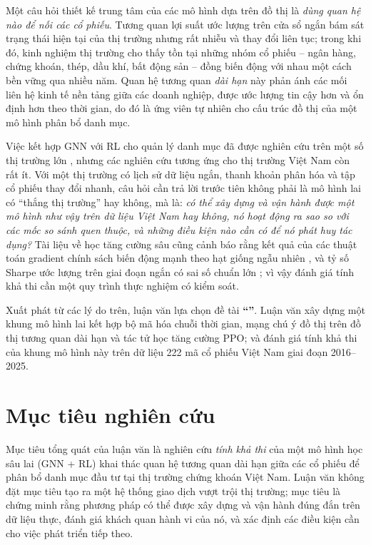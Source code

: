Một câu hỏi thiết kế trung tâm của các mô hình dựa trên đồ thị là \emph{dùng quan hệ nào để nối các cổ phiếu}. Tương quan lợi suất ước lượng trên cửa sổ ngắn bám sát trạng thái hiện tại của thị trường nhưng rất nhiễu và thay đổi liên tục; trong khi đó, kinh nghiệm thị trường cho thấy tồn tại những nhóm cổ phiếu -- ngân hàng, chứng khoán, thép, dầu khí, bất động sản -- đồng biến động với nhau một cách bền vững qua nhiều năm. Quan hệ tương quan \emph{dài hạn} này phản ánh các mối liên hệ kinh tế nền tảng giữa các doanh nghiệp, được ước lượng tin cậy hơn và ổn định hơn theo thời gian, do đó là ứng viên tự nhiên cho cấu trúc đồ thị của một mô hình phân bổ danh mục.

Việc kết hợp GNN với RL cho quản lý danh mục đã được nghiên cứu trên một số thị trường lớn \cite{soleymani2021,sun2024graphsage,sun2024cikm,ma2024,li2025alphagat}, nhưng các nghiên cứu tương ứng cho thị trường Việt Nam còn rất ít. Với một thị trường có lịch sử dữ liệu ngắn, thanh khoản phân hóa và tập cổ phiếu thay đổi nhanh, câu hỏi cần trả lời trước tiên không phải là mô hình lai có ``thắng thị trường'' hay không, mà là: \emph{có thể xây dựng và vận hành được một mô hình như vậy trên dữ liệu Việt Nam hay không, nó hoạt động ra sao so với các mốc so sánh quen thuộc, và những điều kiện nào cần có để nó phát huy tác dụng?} Tài liệu về học tăng cường sâu cũng cảnh báo rằng kết quả của các thuật toán gradient chính sách biến động mạnh theo hạt giống ngẫu nhiên \cite{henderson2018,engstrom2020}, và tỷ số Sharpe ước lượng trên giai đoạn ngắn có sai số chuẩn lớn \cite{lo2002,bailey2014}; vì vậy đánh giá tính khả thi cần một quy trình thực nghiệm có kiểm soát.

Xuất phát từ các lý do trên, luận văn lựa chọn đề tài \textbf{``\tendetaithuong''}. Luận văn xây dựng một khung mô hình lai kết hợp bộ mã hóa chuỗi thời gian, mạng chú ý đồ thị trên đồ thị tương quan dài hạn và tác tử học tăng cường PPO; và đánh giá tính khả thi của khung mô hình này trên dữ liệu 222 mã cổ phiếu Việt Nam giai đoạn 2016--2025.

\section*{Mục tiêu nghiên cứu}

Mục tiêu tổng quát của luận văn là nghiên cứu \emph{tính khả thi} của một mô hình học sâu lai (GNN + RL) khai thác quan hệ tương quan dài hạn giữa các cổ phiếu để phân bổ danh mục đầu tư tại thị trường chứng khoán Việt Nam. Luận văn không đặt mục tiêu tạo ra một hệ thống giao dịch vượt trội thị trường; mục tiêu là chứng minh rằng phương pháp có thể được xây dựng và vận hành đúng đắn trên dữ liệu thực, đánh giá khách quan hành vi của nó, và xác định các điều kiện cần cho việc phát triển tiếp theo.

